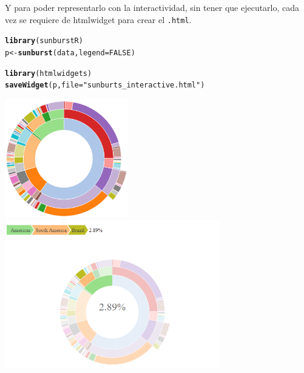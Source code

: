 \documentclass{article}\usepackage[]{graphicx}\usepackage[]{color}
\makeatletter
\newcommand{\hlnum}[1]{\textcolor[rgb]{0.686,0.059,0.569}{#1}}%
\newcommand{\hlstr}[1]{\textcolor[rgb]{0.192,0.494,0.8}{#1}}%
\newcommand{\hlstd}[1]{\textcolor[rgb]{0.345,0.345,0.345}{#1}}%
\newcommand{\hlkwb}[1]{\textcolor[rgb]{0.69,0.353,0.396}{#1}}%
\newcommand{\hlkwc}[1]{\textcolor[rgb]{0.333,0.667,0.333}{#1}}%
\newcommand{\hlkwd}[1]{\textcolor[rgb]{0.737,0.353,0.396}{\textbf{#1}}}%
\newenvironment{kframe}{%
 \def\at@end@of@kframe{}%
 \ifinner\ifhmode%
  \def\at@end@of@kframe{\end{minipage}}%
  \begin{minipage}{\columnwidth}%
 \fi\fi%
 \def\FrameCommand##1{\hskip\@totalleftmargin \hskip-\fboxsep
 \colorbox{shadecolor}{##1}\hskip-\fboxsep
     \hskip-\linewidth \hskip-\@totalleftmargin \hskip\columnwidth}%
 \MakeFramed {\advance\hsize-\width
   \@totalleftmargin\z@ \linewidth\hsize
   \@setminipage}}%
 {\par\unskip\endMakeFramed%
 \at@end@of@kframe}
\newenvironment{knitrout}{}{} %
\makeatother
\begin{document}
Y para poder representarlo con la interactividad, sin tener que ejecutarlo, cada vez se requiere de htmlwidget para crear el \texttt{.html}.
\begin{knitrout}
\color{fgcolor}\begin{kframe}
\begin{alltt}
\hlkwd{library}\hlstd{(sunburstR)}
\hlstd{p} \hlkwb{<-} \hlkwd{sunburst}\hlstd{(data,} \hlkwc{legend} \hlstd{=} \hlnum{FALSE}\hlstd{)}

\hlkwd{library}\hlstd{(htmlwidgets)}
\hlkwd{saveWidget}\hlstd{(p,} \hlkwc{file} \hlstd{=} \hlstr{"sunburts_interactive.html"}\hlstd{)}
\end{alltt}
\end{kframe}
\end{knitrout}
\vbox{
    \centering
    \includegraphics[width=0.4\textwidth]{imag/sunburts_interactive_1}
}
\vbox{
    \centering
    \includegraphics[width=0.7\textwidth]{imag/sunburts_interactive_2}
}
\end{document}
